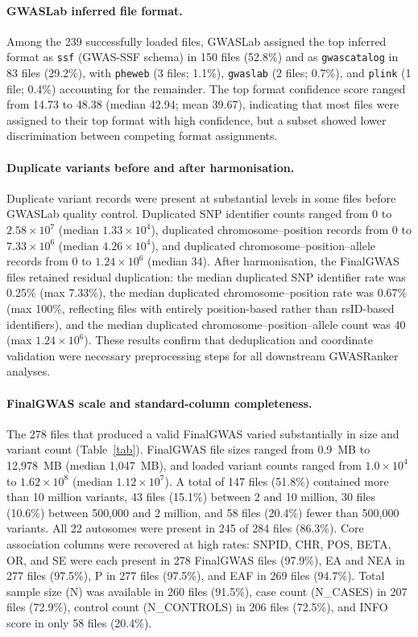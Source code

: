 \documentclass[11pt,a4paper]{article}
\begin{document}
\paragraph{GWASLab inferred file format.}Among the 239 successfully loaded files, GWASLab assigned the top inferred format as \texttt{ssf} (GWAS-SSF schema) in 150 files (52.8\%) and as \texttt{gwascatalog} in 83 files (29.2\%), with \texttt{pheweb} (3 files; 1.1\%), \texttt{gwaslab} (2 files; 0.7\%), and \texttt{plink} (1 file; 0.4\%) accounting for the remainder. The top format confidence score ranged from 14.73 to 48.38 (median 42.94; mean 39.67), indicating that most files were assigned to their top format with high confidence, but a subset showed lower discrimination between competing format assignments.

\paragraph{Duplicate variants before and after harmonisation.}Duplicate variant records were present at substantial levels in some files before GWASLab quality control. Duplicated SNP identifier counts ranged from 0 to $2.58 \times 10^{7}$ (median $1.33 \times 10^{4}$), duplicated chromosome--position records from 0 to $7.33 \times 10^{6}$ (median $4.26 \times 10^{4}$), and duplicated chromosome--position--allele records from 0 to $1.24 \times 10^{6}$ (median 34). After harmonisation, the FinalGWAS files retained residual duplication: the median duplicated SNP identifier rate was 0.25\% (max 7.33\%), the median duplicated chromosome--position rate was 0.67\% (max 100\%, reflecting files with entirely position-based rather than rsID-based identifiers), and the median duplicated chromosome--position--allele count was 40 (max $1.24 \times 10^{6}$). These results confirm that deduplication and coordinate validation were necessary preprocessing steps for all downstream GWASRanker analyses.

\paragraph{FinalGWAS scale and standard-column completeness.}The 278 files that produced a valid FinalGWAS varied substantially in size and variant count (Table~\ref{tab}). FinalGWAS file sizes ranged from 0.9~MB to 12,978~MB (median 1,047~MB), and loaded variant counts ranged from $1.0 \times 10^{4}$ to $1.62 \times 10^{8}$ (median $1.12 \times 10^{7}$). A total of 147 files (51.8\%) contained more than 10 million variants, 43 files (15.1\%) between 2 and 10 million, 30 files (10.6\%) between 500,000 and 2 million, and 58 files (20.4\%) fewer than 500,000 variants. All 22 autosomes were present in 245 of 284 files (86.3\%). Core association columns were recovered at high rates: SNPID, CHR, POS, BETA, OR, and SE were each present in 278 FinalGWAS files (97.9\%), EA and NEA in 277 files (97.5\%), P in 277 files (97.5\%), and EAF in 269 files (94.7\%). Total sample size (N) was available in 260 files (91.5\%), case count (N\_CASES) in 207 files (72.9\%), control count (N\_CONTROLS) in 206 files (72.5\%), and INFO score in only 58 files (20.4\%).
\end{document}
